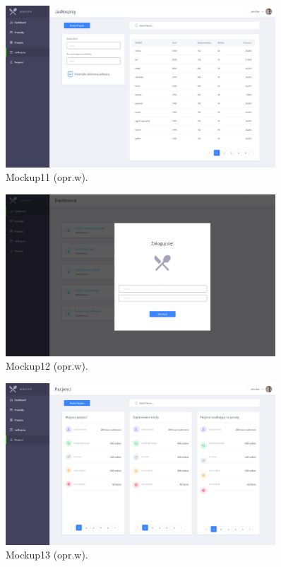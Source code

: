 \begin{minipage}{\textwidth}
    \begin{figure}[H]
        \centering\includegraphics[width=0.9\textwidth]{img/mockups/mockup11.png}
        \caption{Mockup11 (opr.w).}\label{rysunek:mockup11}
    \end{figure}
\end{minipage}

\begin{minipage}{\textwidth}
    \begin{figure}[H]
        \centering\includegraphics[width=0.9\textwidth]{img/mockups/mockup12.png}
        \caption{Mockup12 (opr.w).}\label{rysunek:mockup12}
    \end{figure}
\end{minipage}

\begin{minipage}{\textwidth}
    \begin{figure}[H]
        \centering\includegraphics[width=0.9\textwidth]{img/mockups/mockup13.png}
        \caption{Mockup13 (opr.w).}\label{rysunek:mockup13}
    \end{figure}
\end{minipage}

